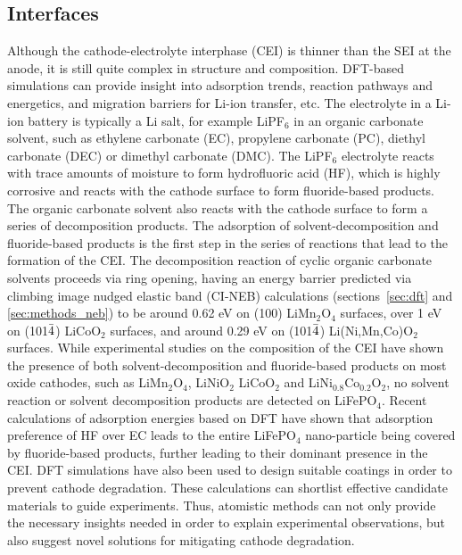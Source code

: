 \documentclass[../main.tex]{subfiles}
\begin{document}
\subsection{Interfaces}
\label{sec:cathode_interfaces}
Although the cathode-electrolyte interphase (CEI) is thinner than the SEI at the anode, it is still quite complex in structure and composition.\cite{Gauthier2015, Edstrom2004} DFT-based simulations can provide insight into adsorption trends,\cite{Bhandari2020} reaction pathways and energetics,\cite{Tebbe2015a, Tebbe2015b} and migration barriers for Li-ion transfer,\cite{Bhandari2019} etc. The electrolyte in a Li-ion battery is typically a Li salt, for example LiPF$_6$ in an organic carbonate solvent, such as ethylene carbonate (EC), propylene carbonate (PC), diethyl carbonate (DEC) or dimethyl carbonate (DMC). The LiPF$_6$ electrolyte reacts with trace amounts of moisture to form hydrofluoric acid (HF),\cite{Tebbe2015a} which is highly corrosive and reacts with the cathode surface to form fluoride-based products.\cite{Tebbe2015b} The organic carbonate solvent also reacts with the cathode surface to form a series of decomposition products.\cite{Tebbe2016} The adsorption of solvent-decomposition and fluoride-based products is the first step in the series of reactions that lead to the formation of the CEI. The decomposition reaction of cyclic organic carbonate solvents proceeds via ring opening, having an energy barrier predicted via climbing image nudged elastic band (CI-NEB) calculations (sections~\ref{sec:dft} and \ref{sec:methods_neb}) to be around 0.62 eV on (100) LiMn$_2$O$_4$ surfaces,\cite{leung2012first} over 1 eV on (101$\Bar{4}$) LiCoO$_2$ surfaces,\cite{Tebbe2016} and around 0.29 eV on (101$\Bar{4}$) Li(Ni,Mn,Co)O$_2$ surfaces\cite{Xu2017}. While experimental studies on the composition of the CEI have shown the presence of both solvent-decomposition and fluoride-based products on most oxide cathodes, such as LiMn$_2$O$_4$, LiNiO$_2$ LiCoO$_2$ and LiNi$_{0.8}$Co$_{0.2}$O$_2$, no solvent reaction or solvent decomposition products are detected on LiFePO$_4$.\cite{Edstrom2004, Malmgren2010} Recent calculations of adsorption energies based on DFT have shown that adsorption preference of HF over EC leads to the entire LiFePO$_4$ nano-particle being covered by fluoride-based products, further leading to their dominant presence in the CEI.\cite{Bhandari2020} DFT simulations have also been used to design suitable coatings in order to prevent cathode degradation.\cite{Tebbe2015b} These calculations can shortlist effective candidate materials to guide experiments. Thus, atomistic methods can not only provide the necessary insights needed in order to explain experimental observations, but also suggest novel solutions for mitigating cathode degradation.
\end{document}
